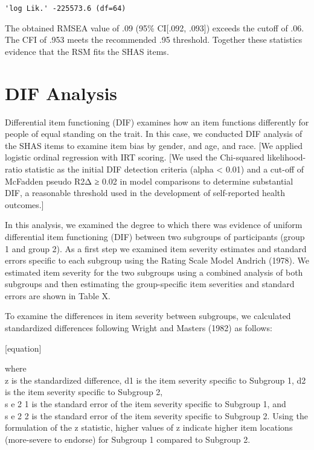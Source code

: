 \documentclass[
  letterpaper,
  DIV=11,
  numbers=noendperiod]{scrreport}
\begin{document}
\begin{verbatim}
'log Lik.' -225573.6 (df=64)
\end{verbatim}

The obtained RMSEA value of .09 (95\% CI{[}.092, .093{]}) exceeds the
cutoff of .06. The CFI of .953 meets the recommended .95 threshold.
Together these statistics evidence that the RSM fits the SHAS items.

\hypertarget{dif-analysis}{%
\section*{DIF Analysis}\label{dif-analysis}}

Differential item functioning (DIF) examines how an item functions
differently for people of equal standing on the trait. In this case, we
conducted DIF analysis of the SHAS items to examine item bias by gender,
and age, and race. {[}We applied logistic ordinal regression with IRT
scoring. {[}We used the Chi-squared likelihood-ratio statistic as the
initial DIF detection criteria (alpha \textless{} 0.01) and a cut-off of
McFadden pseudo R2Δ ≥ 0.02 in model comparisons to determine substantial
DIF, a reasonable threshold used in the development of self-reported
health outcomes.{]}

In this analysis, we examined the degree to which there was evidence of
uniform differential item functioning (DIF) between two subgroups of
participants (group 1 and group 2). As a first step we examined item
severity estimates and standard errors specific to each subgroup using
the Rating Scale Model Andrich (1978). We estimated item severity for
the two subgroups using a combined analysis of both subgroups and then
estimating the group-specific item severities and standard errors are
shown in Table X.

To examine the differences in item severity between subgroups, we
calculated standardized differences following Wright and Masters (1982)
as follows:

{[}equation{]}

where\\
z is the standardized difference, d1 is the item severity specific to
Subgroup 1, d2 is the item severity specific to Subgroup 2,\\
s e 2 1 is the standard error of the item severity specific to Subgroup
1, and\\
s e 2 2 is the standard error of the item severity specific to Subgroup
2. Using the formulation of the z statistic, higher values of z indicate
higher item locations (more-severe to endorse) for Subgroup 1 compared
to Subgroup 2.
\end{document}
